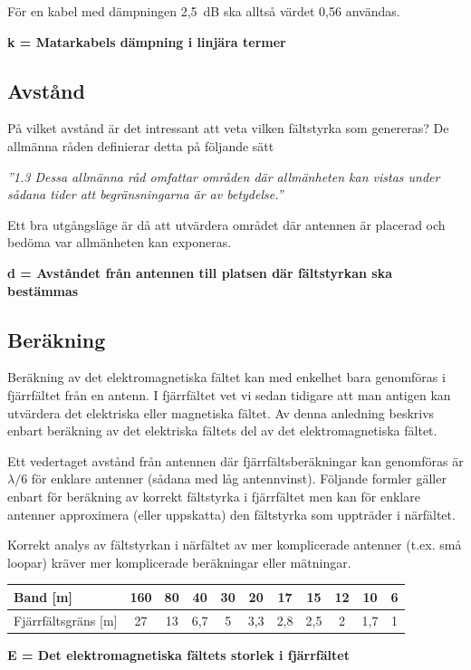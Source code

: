 För en kabel med dämpningen 2,5~dB ska alltså värdet 0,56 användas.

\textbf{k = Matarkabels dämpning i linjära termer}

\subsection{Avstånd}

På vilket avstånd är det intressant att veta vilken fältstyrka som genereras?
De allmänna råden definierar detta på följande sätt

\emph{''1.3 Dessa allmänna råd omfattar områden där allmänheten kan vistas under sådana tider att begränsningarna är av betydelse.''}

Ett bra utgångsläge är då att utvärdera området där antennen är placerad och bedöma var allmänheten kan exponeras.

\textbf{d = Avståndet från antennen till platsen där fältstyrkan ska bestämmas}

\subsection{Beräkning}

Beräkning av det elektromagnetiska fältet kan med enkelhet bara
genomföras i fjärrfältet från en antenn. I fjärrfältet vet vi sedan
tidigare att man antigen kan utvärdera det elektriska eller
magnetiska fältet. Av denna anledning beskrivs enbart beräkning av
det elektriska fältets del av det elektromagnetiska fältet.

Ett vedertaget avstånd från antennen där fjärrfältsberäkningar kan
genomföras är \(\lambda/6\) för enklare antenner (sådana med låg
antennvinst). Följande formler gäller enbart för beräkning av korrekt
fältstyrka i fjärrfältet men kan för enklare antenner approximera
(eller uppskatta) den fältstyrka som uppträder i närfältet.

Korrekt analys av fältstyrkan i närfältet av mer komplicerade antenner
(t.ex. små loopar) kräver mer komplicerade beräkningar eller mätningar.

\begin{tabular}{|l|c|c|c|c|c|c|c|c|c|c|}
\hline
Band [m] & 160 & 80 & 40 & 30 & 20 & 17 & 15 & 12 & 10 & 6 \\ \hline
Fjärrfältsgräns [m] & 27 & 13 & 6,7 & 5 & 3,3 & 2,8 & 2,5 & 2 & 1,7 & 1 \\ \hline
\end{tabular}

\textbf{E = Det elektromagnetiska fältets storlek i fjärrfältet}

